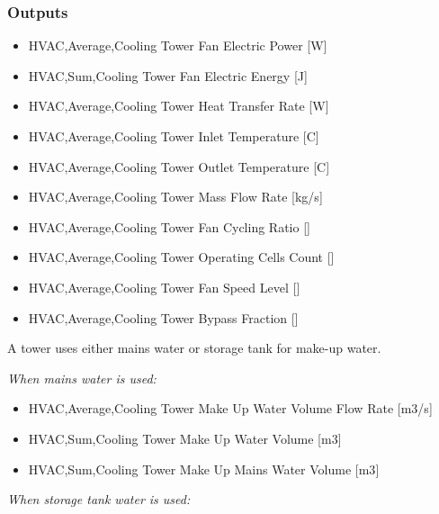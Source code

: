\subsubsection{Outputs}\label{outputs-1-003}

\begin{itemize}
\item
  HVAC,Average,Cooling Tower Fan Electric Power {[}W{]}
\item
  HVAC,Sum,Cooling Tower Fan Electric Energy {[}J{]}
\item
  HVAC,Average,Cooling Tower Heat Transfer Rate {[}W{]}
\item
  HVAC,Average,Cooling Tower Inlet Temperature {[}C{]}
\item
  HVAC,Average,Cooling Tower Outlet Temperature {[}C{]}
\item
  HVAC,Average,Cooling Tower Mass Flow Rate {[}kg/s{]}
\item
  HVAC,Average,Cooling Tower Fan Cycling Ratio {[]}
\item
  HVAC,Average,Cooling Tower Operating Cells Count {[]}
\item
  HVAC,Average,Cooling Tower Fan Speed Level {[]}
\item
  HVAC,Average,Cooling Tower Bypass Fraction {[]}
\end{itemize}

A tower uses either mains water or storage tank for make-up water.

\emph{When mains water is used:}

\begin{itemize}
\item
  HVAC,Average,Cooling Tower Make Up Water Volume Flow Rate {[}m3/s{]}
\item
  HVAC,Sum,Cooling Tower Make Up Water Volume {[}m3{]}
\item
  HVAC,Sum,Cooling Tower Make Up Mains Water Volume {[}m3{]}
\end{itemize}

\emph{When storage tank water is used:}

